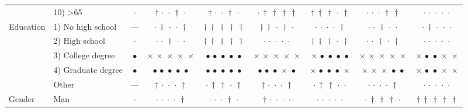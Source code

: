 {\begin{longtable}[t]{llccccccc}
 & 10) >65 & $\cdot$ & ${\dagger}\,{\cdot}\,{\cdot}\,{\dagger}\,{\cdot}$ & ${\dagger}\,{\cdot}\,{\cdot}\,{\dagger}\,{\cdot}$ & ${\cdot}\,{\dagger}\,{\dagger}\,{\dagger}\,{\dagger}$ & ${\dagger}\,{\dagger}\,{\dagger}\,{\cdot}\,{\dagger}$ & ${\cdot}\,{\cdot}\,{\cdot}\,{\dagger}\,{\dagger}$ & ${\cdot}\,{\cdot}\,{\cdot}\,{\cdot}\,{\cdot}$ \\
\cline{1-9}
\multirow[t]{5}{*}{Education} & 1) No high school & --- & ${\cdot}\,{\dagger}\,{\cdot}\,{\cdot}\,{\dagger}$ & ${\dagger}\,{\dagger}\,{\dagger}\,{\dagger}\,{\dagger}$ & ${\dagger}\,{\dagger}\,{\cdot}\,{\dagger}\,{\cdot}$ & ${\cdot}\,{\cdot}\,{\cdot}\,{\cdot}\,{\dagger}$ & ${\cdot}\,{\cdot}\,{\dagger}\,{\cdot}\,{\cdot}$ & ${\cdot}\,{\dagger}\,{\cdot}\,{\cdot}\,{\cdot}$ \\
 & 2) High school & $\cdot$ & ${\cdot}\,{\cdot}\,{\dagger}\,{\cdot}\,{\cdot}$ & ${\dagger}\,{\dagger}\,{\dagger}\,{\dagger}\,{\dagger}$ & ${\cdot}\,{\cdot}\,{\cdot}\,{\cdot}\,{\cdot}$ & ${\dagger}\,{\dagger}\,{\dagger}\,{\cdot}\,{\dagger}$ & ${\cdot}\,{\cdot}\,{\dagger}\,{\cdot}\,{\dagger}$ & ${\cdot}\,{\cdot}\,{\cdot}\,{\cdot}\,{\cdot}$ \\
 & 3) College degree & $\bullet$ & ${\times}\,{\times}\,{\times}\,{\times}\,{\times}$ & ${\bullet}\,{\bullet}\,{\bullet}\,{\bullet}\,{\bullet}$ & ${\times}\,{\times}\,{\times}\,{\times}\,{\times}$ & ${\times}\,{\bullet}\,{\bullet}\,{\bullet}\,{\bullet}$ & ${\times}\,{\times}\,{\times}\,{\times}\,{\times}$ & ${\times}\,{\bullet}\,{\bullet}\,{\times}\,{\times}$ \\
 & 4) Graduate degree & $\bullet$ & ${\bullet}\,{\bullet}\,{\bullet}\,{\bullet}\,{\bullet}$ & ${\bullet}\,{\bullet}\,{\bullet}\,{\bullet}\,{\bullet}$ & ${\bullet}\,{\bullet}\,{\bullet}\,{\times}\,{\bullet}$ & ${\times}\,{\bullet}\,{\bullet}\,{\bullet}\,{\times}$ & ${\times}\,{\times}\,{\times}\,{\bullet}\,{\bullet}$ & ${\times}\,{\bullet}\,{\bullet}\,{\times}\,{\times}$ \\
 & Other & --- & ${\dagger}\,{\cdot}\,{\cdot}\,{\cdot}\,{\dagger}$ & ${\cdot}\,{\dagger}\,{\dagger}\,{\cdot}\,{\dagger}$ & ${\dagger}\,{\cdot}\,{\cdot}\,{\cdot}\,{\dagger}$ & ${\cdot}\,{\dagger}\,{\dagger}\,{\cdot}\,{\cdot}$ & ${\cdot}\,{\cdot}\,{\cdot}\,{\cdot}\,{\dagger}$ & ${\cdot}\,{\cdot}\,{\cdot}\,{\cdot}\,{\cdot}$ \\
\cline{1-9}
\multirow[t]{3}{*}{Gender} & Man & $\cdot$ & ${\cdot}\,{\cdot}\,{\cdot}\,{\cdot}\,{\dagger}$ & ${\cdot}\,{\cdot}\,{\cdot}\,{\dagger}\,{\cdot}$ & ${\dagger}\,{\cdot}\,{\cdot}\,{\cdot}\,{\cdot}$ & ${\cdot}\,{\cdot}\,{\cdot}\,{\cdot}\,{\cdot}$ & ${\cdot}\,{\dagger}\,{\dagger}\,{\dagger}\,{\cdot}$ & ${\dagger}\,{\dagger}\,{\dagger}\,{\dagger}\,{\dagger}$ \\

\end{longtable}}
